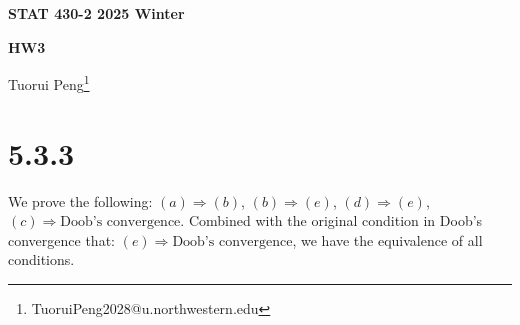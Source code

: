 \documentclass[11pt,a4paper]{ctexart}
\numberwithin{equation}{section}%
\begin{document}
\begin{center}\thispagestyle{plain}

{\LARGE\textbf{STAT 430-2 2025 Winter}}

{\Large\textbf{HW3}}

Tuorui Peng\footnote{TuoruiPeng2028@u.northwestern.edu}
\end{center}

\thispagestyle{myheadings}
\pagestyle{myheadings}






\section{5.3.3}

We prove the following: $ (a) \Rightarrow (b) $, $ (b) \Rightarrow (e) $, $ (d) \Rightarrow (e) $, $ (c) \Rightarrow \text{Doob's convergence} $. Combined with the original condition in Doob's convergence that: $ (e) \Rightarrow \text{Doob's convergence} $, we have the equivalence of all conditions.
\end{document}
